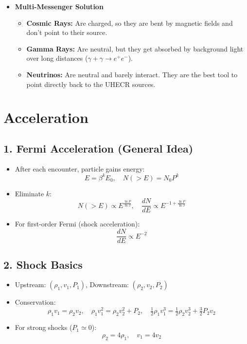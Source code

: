 \documentclass{sciposter}
\begin{document}
\begin{multicols}{3}
\begin{itemize}
    \item \textbf{Multi-Messenger Solution}
    \begin{itemize}
        \item \textbf{Cosmic Rays:} Are charged, so they are bent by magnetic fields and don't point to their source.
        \item \textbf{Gamma Rays:} Are neutral, but they get absorbed by background light over long distances ($\gamma + \gamma \rightarrow e^+e^-$).
        \item \textbf{Neutrinos:} Are neutral and barely interact. They are the best tool to point directly back to the UHECR sources.
    \end{itemize}
\end{itemize}



\section{Acceleration}

\subsection*{1. Fermi Acceleration (General Idea)}
\begin{itemize}
    \item After each encounter, particle gains energy:
    \[
        E = \beta^k E_0, \quad N(>E) = N_0 P^k
    \]
    \item Eliminate $k$:
    \[
        N(>E) \propto E^{\frac{\ln P}{\ln \beta}}, \quad 
        \frac{dN}{dE} \propto E^{-1 + \frac{\ln P}{\ln \beta}}
    \]
    \item For first-order Fermi (shock acceleration): 
    \[
        \frac{dN}{dE} \propto E^{-2}
    \]
\end{itemize}

\subsection*{2. Shock Basics}
\begin{itemize}
    \item Upstream: $(\rho_1, v_1, P_1)$, Downstream: $(\rho_2, v_2, P_2)$
    \item Conservation:
    \[
        \rho_1 v_1 = \rho_2 v_2, \quad
        \rho_1 v_1^2 = \rho_2 v_2^2 + P_2, \quad
        \tfrac{1}{2}\rho_1 v_1^3 = \tfrac{1}{2}\rho_2 v_2^3 + \tfrac{3}{2}P_2 v_2
    \]
    \item For strong shocks ($P_1 \simeq 0$):
    \[
        \rho_2 = 4\rho_1, \quad v_1 = 4v_2
    \]
\end{itemize}


\end{multicols}
\end{document}
